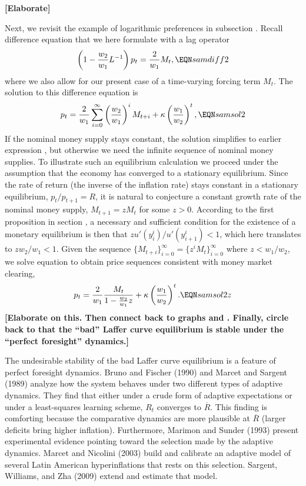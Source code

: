 \medskip
\noindent
{\bf [Elaborate]}
\medskip

Next, we revisit the example of logarithmic preferences in
subsection . Recall difference equation 
 that we here formulate with a lag operator
$$\left( 1 - {w_2 \over w_1} L^{-1} \right) p_t = {2 \over w_1} M_t,
                                                       \EQN samdiff2
$$
where we also allow for our present case of a time-varying forcing term
$M_t$. The solution to this difference equation is
$$ p_t = {2 \over w_1} \sum_{i=0}^\infty \left({w_2 \over w_1}\right)^i M_{t+i}
      + \kappa \left({w_1\over w_2}\right)^t, \EQN samsol2 $$
If the nominal money supply stays constant, the solution simplifies
to earlier expression , but otherwise we need the infinite sequence
of nominal money supplies. To illustrate such an equilibrium
calculation we proceed under the assumption that the economy has converged 
to a stationary equilibrium. Since the rate of return (the
inverse of the inflation rate) stays constant in a stationary equilibrium,
$p_t/p_{t+1}=R$, it is natural to conjecture a constant growth rate of the
nominal money supply, $M_{t+1} = zM_t$ for some $z>0$. According to
the first proposition in section , a necessary 
and sufficient condition for the existence of a monetary equilibrium
is then that $z u'(y^i_i)/u'(y^i_{i+1})<1$, which here translates
to  $z w_2/w_1<1$.
Given the sequence $\{M_{t+i}\}_{i=0}^\infty=\{z^i M_t\}_{i=0}^\infty$
where $z<w_1/w_2$,  we solve equation  to obtain  
price sequences consistent with money market clearing,
$$ p_t = {2 \over w_1} { M_t \over 1 - {w_2 \over w_1} z }
      + \kappa \left({w_1\over w_2}\right)^t. \EQN samsol2z 
$$
\medskip
\noindent
{\bf [Elaborate on this. Then connect back to graphs 
and . Finally, circle back to that the ``bad'' Laffer curve 
equilibrium is stable under the ``perfect foresight'' dynamics.]}


The undesirable stability of the bad Laffer curve equilibrium is a feature of
perfect foresight dynamics.
Bruno and Fischer (1990) and Marcet and Sargent (1989) analyze
how the system behaves under two different types of adaptive
dynamics.  They find that either under a crude form
of  adaptive expectations  or under a least-squares learning scheme,
$R_t$ converges to  $\overline R$.   This finding  is comforting because
the comparative dynamics are more plausible at $\overline  R$
(larger deficits bring higher inflation).  Furthermore,
Marimon and Sunder (1993) present experimental evidence
pointing toward the selection  made by the adaptive dynamics.
Marcet and Nicolini  (2003) build and calibrate an adaptive model of several
Latin American hyperinflations that rests on this selection. Sargent, Williams, and Zha (2009)
extend and estimate that model.
%
%








